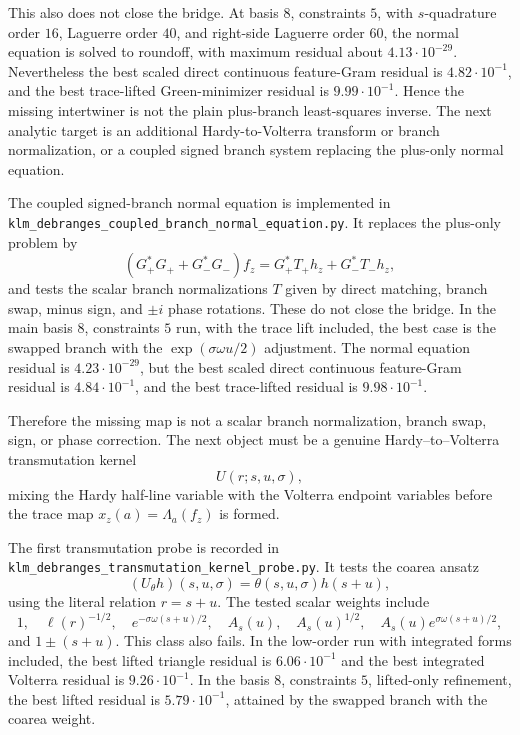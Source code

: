 \documentclass[11pt]{article}
\begin{document}
This also does not close the bridge.  At basis \(8\), constraints \(5\), with
\(s\)-quadrature order \(16\), Laguerre order \(40\), and right-side Laguerre
order \(60\), the normal equation is solved to roundoff, with maximum residual
about \(4.13\cdot10^{-29}\).  Nevertheless the best scaled direct continuous
feature-Gram residual is \(4.82\cdot10^{-1}\), and the best trace-lifted
Green-minimizer residual is \(9.99\cdot10^{-1}\).  Hence the missing
intertwiner is not the plain plus-branch least-squares inverse.  The next
analytic target is an additional Hardy-to-Volterra transform or branch
normalization, or a coupled signed branch system replacing the plus-only normal
equation.

The coupled signed-branch normal equation is implemented in
\texttt{klm\_debranges\_coupled\_branch\_normal\_equation.py}.  It replaces
the plus-only problem by
\[
  (G_+^\ast G_+ + G_-^\ast G_-)f_z
  =
  G_+^\ast T_+h_z + G_-^\ast T_-h_z,
\]
and tests the scalar branch normalizations \(T\) given by direct matching,
branch swap, minus sign, and \(\pm i\) phase rotations.  These do not close the
bridge.  In the main basis \(8\), constraints \(5\) run, with the trace lift
included, the best case is the swapped branch with the
\(\exp(\sigma\omega u/2)\) adjustment.  The normal equation residual is
\(4.23\cdot10^{-29}\), but the best scaled direct continuous feature-Gram
residual is \(4.84\cdot10^{-1}\), and the best trace-lifted residual is
\(9.98\cdot10^{-1}\).

Therefore the missing map is not a scalar branch normalization, branch swap,
sign, or phase correction.  The next object must be a genuine
Hardy--to--Volterra transmutation kernel
\[
  U(r;s,u,\sigma),
\]
mixing the Hardy half-line variable with the Volterra endpoint variables before
the trace map \(x_z(a)=\Lambda_a(f_z)\) is formed.

The first transmutation probe is recorded in
\texttt{klm\_debranges\_transmutation\_kernel\_probe.py}.  It tests the
coarea ansatz
\[
  (U_\theta h)(s,u,\sigma)=\theta(s,u,\sigma)h(s+u),
\]
using the literal relation \(r=s+u\).  The tested scalar weights include
\[
  1,\quad \ell(r)^{-1/2},\quad e^{-\sigma\omega(s+u)/2},\quad
  A_s(u),\quad A_s(u)^{1/2},\quad A_s(u)e^{\sigma\omega(s+u)/2},
\]
and \(1\pm(s+u)\).  This class also fails.  In the low-order run with
integrated forms included, the best lifted triangle residual is
\(6.06\cdot10^{-1}\) and the best integrated Volterra residual is
\(9.26\cdot10^{-1}\).  In the basis \(8\), constraints \(5\), lifted-only
refinement, the best lifted residual is \(5.79\cdot10^{-1}\), attained by the
swapped branch with the coarea weight.
\end{document}
